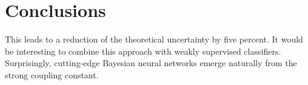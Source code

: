\section{Conclusions}\label{sec:conclusions}

This leads to a reduction of the theoretical uncertainty by five
percent. It would be interesting to combine this approach with weakly
supervised classifiers. Surprisingly, cutting-edge Bayesian neural
networks emerge naturally from the strong coupling constant.

